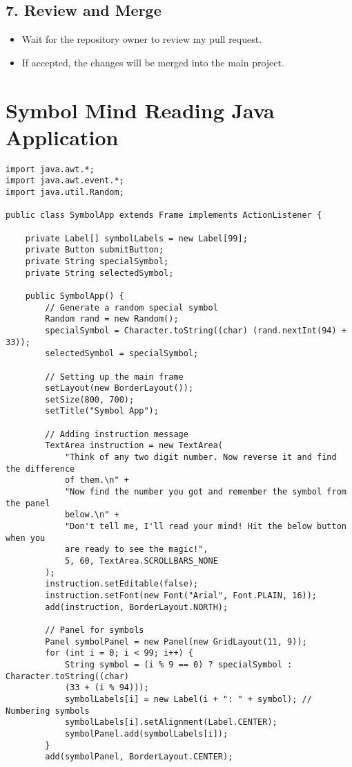 \documentclass[a4paper,12pt]{article}
\begin{document}
\subsection*{7. Review and Merge}
\begin{itemize}
    \item Wait for the repository owner to review my pull request.
    \item If accepted, the changes will be merged into the main project.
\end{itemize}

\newpage

\section*{Symbol Mind Reading Java Application}
\begin{verbatim}
import java.awt.*;
import java.awt.event.*;
import java.util.Random;

public class SymbolApp extends Frame implements ActionListener {

    private Label[] symbolLabels = new Label[99];
    private Button submitButton;
    private String specialSymbol;
    private String selectedSymbol;

    public SymbolApp() {
        // Generate a random special symbol
        Random rand = new Random();
        specialSymbol = Character.toString((char) (rand.nextInt(94) + 33)); 
        selectedSymbol = specialSymbol;

        // Setting up the main frame
        setLayout(new BorderLayout());
        setSize(800, 700);
        setTitle("Symbol App");

        // Adding instruction message
        TextArea instruction = new TextArea(
            "Think of any two digit number. Now reverse it and find the difference 
            of them.\n" +
            "Now find the number you got and remember the symbol from the panel 
            below.\n" +
            "Don't tell me, I'll read your mind! Hit the below button when you 
            are ready to see the magic!",
            5, 60, TextArea.SCROLLBARS_NONE
        );
        instruction.setEditable(false);
        instruction.setFont(new Font("Arial", Font.PLAIN, 16));
        add(instruction, BorderLayout.NORTH);

        // Panel for symbols
        Panel symbolPanel = new Panel(new GridLayout(11, 9));
        for (int i = 0; i < 99; i++) {
            String symbol = (i % 9 == 0) ? specialSymbol : Character.toString((char) 
            (33 + (i % 94)));
            symbolLabels[i] = new Label(i + ": " + symbol); // Numbering symbols
            symbolLabels[i].setAlignment(Label.CENTER);
            symbolPanel.add(symbolLabels[i]);
        }
        add(symbolPanel, BorderLayout.CENTER);


\end{verbatim}
\end{document}
